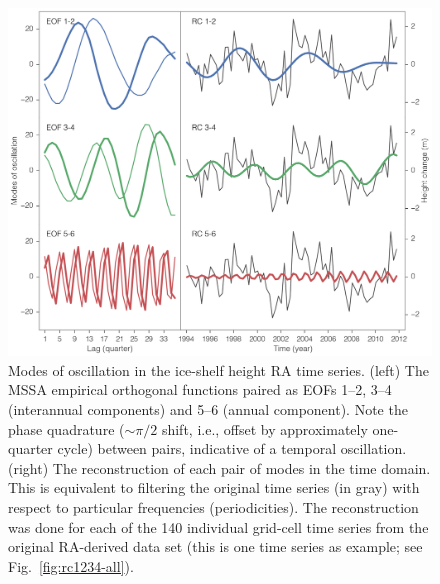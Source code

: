 \begin{figure}[!h]
  \centering
  \includegraphics[width=\textwidth]{img/mssa_eof_rc_v2.png}
  \caption[Modes of oscillation in the ice-shelf height RA time series]{
  \ssp \footnotesize
  Modes of oscillation in the ice-shelf height RA time series. (left) The MSSA empirical orthogonal functions paired as EOFs 1--2, 3--4 (interannual components) and 5--6 (annual component). Note the phase quadrature ($\sim$$\pi/2$ shift, i.e., offset by approximately one-quarter cycle) between pairs, indicative of a temporal oscillation. (right) The reconstruction of each pair of modes in the time domain. This is equivalent to filtering the original time series (in gray) with respect to particular frequencies (periodicities). The reconstruction was done for each of the 140 individual grid-cell time series from the original RA-derived data set (this is one time series as example; see Fig.~\ref{fig:rc1234-all}).
  }
  \label{c4f4}
\end{figure}



